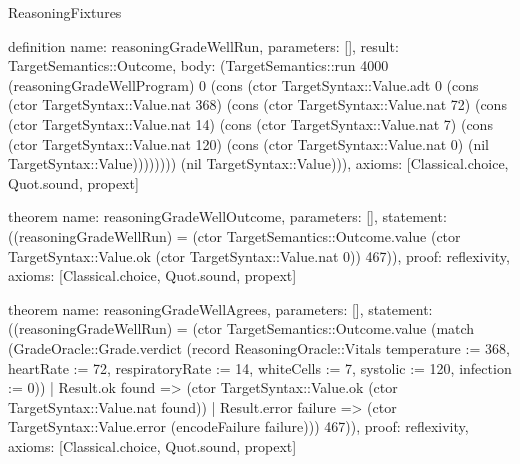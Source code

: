 \begin{lexlean}{ReasoningFixtures}
\begin{semanticmodule}
definition{
  name: reasoningGradeWellRun,
  parameters: [],
  result: TargetSemantics::Outcome,
  body: (TargetSemantics::run 4000 (reasoningGradeWellProgram) 0 (cons (ctor TargetSyntax::Value.adt 0 (cons (ctor TargetSyntax::Value.nat 368) (cons (ctor TargetSyntax::Value.nat 72) (cons (ctor TargetSyntax::Value.nat 14) (cons (ctor TargetSyntax::Value.nat 7) (cons (ctor TargetSyntax::Value.nat 120) (cons (ctor TargetSyntax::Value.nat 0) (nil TargetSyntax::Value)))))))) (nil TargetSyntax::Value))),
  axioms: [Classical.choice, Quot.sound, propext]
}

theorem{
  name: reasoningGradeWellOutcome,
  parameters: [],
  statement: ((reasoningGradeWellRun) = (ctor TargetSemantics::Outcome.value (ctor TargetSyntax::Value.ok (ctor TargetSyntax::Value.nat 0)) 467)),
  proof: reflexivity{},
  axioms: [Classical.choice, Quot.sound, propext]
}

theorem{
  name: reasoningGradeWellAgrees,
  parameters: [],
  statement: ((reasoningGradeWellRun) = (ctor TargetSemantics::Outcome.value (match (GradeOracle::Grade.verdict (record ReasoningOracle::Vitals {temperature := 368, heartRate := 72, respiratoryRate := 14, whiteCells := 7, systolic := 120, infection := 0}))
    | Result.ok found => (ctor TargetSyntax::Value.ok (ctor TargetSyntax::Value.nat found))
    | Result.error failure => (ctor TargetSyntax::Value.error (encodeFailure failure))) 467)),
  proof: reflexivity{},
  axioms: [Classical.choice, Quot.sound, propext]
}


\end{semanticmodule}
\end{lexlean}
